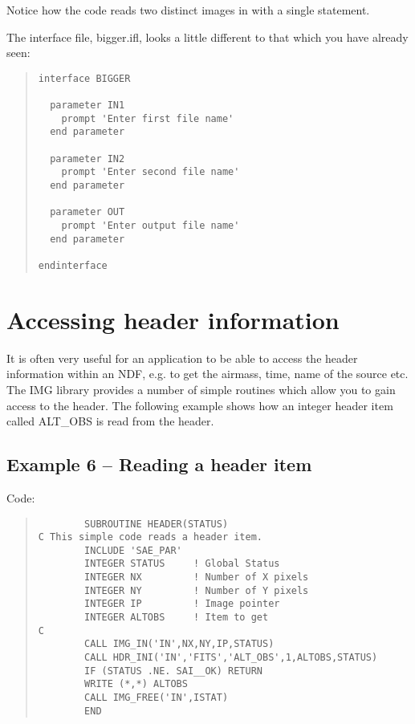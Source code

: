 Notice how the code reads two distinct images in with a single statement.

The interface file, {\sf bigger.ifl}, looks a little different to that
which you have already seen:

\begin{quote}
{\small
\begin{verbatim}
interface BIGGER

  parameter IN1
    prompt 'Enter first file name'
  end parameter

  parameter IN2
    prompt 'Enter second file name'
  end parameter

  parameter OUT
    prompt 'Enter output file name'
  end parameter

endinterface
\end{verbatim}
}
\end{quote}

\section{Accessing header information}

It is often very useful for an application to be able to access the header
information within an NDF, e.g. to get the airmass, time, name of the
source etc. The IMG library provides a number of simple routines which
allow you to gain access to the header. The following example shows how an
integer header item called {\sf ALT\_OBS} is read from the header.

\subsection{Example 6 -- Reading a header item}

Code:

 \begin{quote}
{\small
\begin{verbatim}
        SUBROUTINE HEADER(STATUS)
C This simple code reads a header item.
        INCLUDE 'SAE_PAR'
        INTEGER STATUS     ! Global Status
        INTEGER NX         ! Number of X pixels
        INTEGER NY         ! Number of Y pixels
        INTEGER IP         ! Image pointer
        INTEGER ALTOBS     ! Item to get
C
        CALL IMG_IN('IN',NX,NY,IP,STATUS)
        CALL HDR_INI('IN','FITS','ALT_OBS',1,ALTOBS,STATUS)
        IF (STATUS .NE. SAI__OK) RETURN
        WRITE (*,*) ALTOBS
        CALL IMG_FREE('IN',ISTAT)
        END
\end{verbatim}
}
\end{quote}

